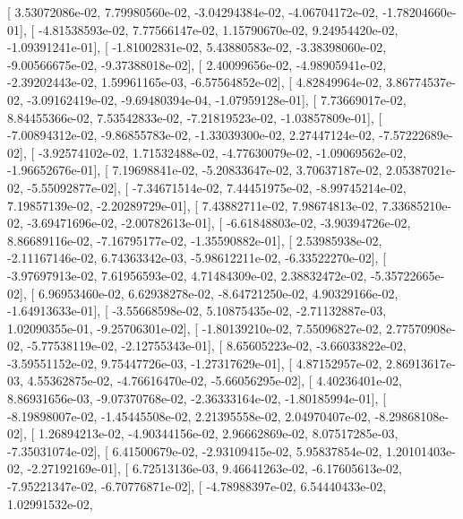 \documentclass{article}
\begin{document}
       [  3.53072086e-02,   7.79980560e-02,  -3.04294384e-02,
         -4.06704172e-02,  -1.78204660e-01],
       [ -4.81538593e-02,   7.77566147e-02,   1.15790670e-02,
          9.24954420e-02,  -1.09391241e-01],
       [ -1.81002831e-02,   5.43880583e-02,  -3.38398060e-02,
         -9.00566675e-02,  -9.37388018e-02],
       [  2.40099656e-02,  -4.98905941e-02,  -2.39202443e-02,
          1.59961165e-03,  -6.57564852e-02],
       [  4.82849964e-02,   3.86774537e-02,  -3.09162419e-02,
         -9.69480394e-04,  -1.07959128e-01],
       [  7.73669017e-02,   8.84455366e-02,   7.53542833e-02,
         -7.21819523e-02,  -1.03857809e-01],
       [ -7.00894312e-02,  -9.86855783e-02,  -1.33039300e-02,
          2.27447124e-02,  -7.57222689e-02],
       [ -3.92574102e-02,   1.71532488e-02,  -4.77630079e-02,
         -1.09069562e-02,  -1.96652676e-01],
       [  7.19698841e-02,  -5.20833647e-02,   3.70637187e-02,
          2.05387021e-02,  -5.55092877e-02],
       [ -7.34671514e-02,   7.44451975e-02,  -8.99745214e-02,
          7.19857139e-02,  -2.20289729e-01],
       [  7.43882711e-02,   7.98674813e-02,   7.33685210e-02,
         -3.69471696e-02,  -2.00782613e-01],
       [ -6.61848803e-02,  -3.90394726e-02,   8.86689116e-02,
         -7.16795177e-02,  -1.35590882e-01],
       [  2.53985938e-02,  -2.11167146e-02,   6.74363342e-03,
         -5.98612211e-02,  -6.33522270e-02],
       [ -3.97697913e-02,   7.61956593e-02,   4.71484309e-02,
          2.38832472e-02,  -5.35722665e-02],
       [  6.96953460e-02,   6.62938278e-02,  -8.64721250e-02,
          4.90329166e-02,  -1.64913633e-01],
       [ -3.55668598e-02,   5.10875435e-02,  -2.71132887e-03,
          1.02090355e-01,  -9.25706301e-02],
       [ -1.80139210e-02,   7.55096827e-02,   2.77570908e-02,
         -5.77538119e-02,  -2.12755343e-01],
       [  8.65605223e-02,  -3.66033822e-02,  -3.59551152e-02,
          9.75447726e-03,  -1.27317629e-01],
       [  4.87152957e-02,   2.86913617e-03,   4.55362875e-02,
         -4.76616470e-02,  -5.66056295e-02],
       [  4.40236401e-02,   8.86931656e-03,  -9.07370768e-02,
         -2.36333164e-02,  -1.80185994e-01],
       [ -8.19898007e-02,  -1.45445508e-02,   2.21395558e-02,
          2.04970407e-02,  -8.29868108e-02],
       [  1.26894213e-02,  -4.90344156e-02,   2.96662869e-02,
          8.07517285e-03,  -7.35031074e-02],
       [  6.41500679e-02,  -2.93109415e-02,   5.95837854e-02,
          1.20101403e-02,  -2.27192169e-01],
       [  6.72513136e-03,   9.46641263e-02,  -6.17605613e-02,
         -7.95221347e-02,  -6.70776871e-02],
       [ -4.78988397e-02,   6.54440433e-02,   1.02991532e-02,
\end{document}

